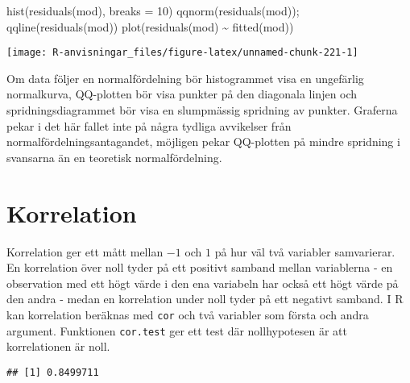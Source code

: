 \documentclass[
]{book}
\newenvironment{Shaded}{\begin{snugshade}}{\end{snugshade}}
\newcommand{\AttributeTok}[1]{\textcolor[rgb]{0.77,0.63,0.00}{#1}}
\newcommand{\DecValTok}[1]{\textcolor[rgb]{0.00,0.00,0.81}{#1}}
\newcommand{\FunctionTok}[1]{\textcolor[rgb]{0.00,0.00,0.00}{#1}}
\newcommand{\NormalTok}[1]{#1}
\newcommand{\SpecialCharTok}[1]{\textcolor[rgb]{0.00,0.00,0.00}{#1}}
\theoremstyle{definition}
\theoremstyle{definition}
\theoremstyle{definition}
\theoremstyle{definition}
\theoremstyle{remark}
\begin{document}
\begin{Shaded}
\begin{Highlighting}[]
\FunctionTok{hist}\NormalTok{(}\FunctionTok{residuals}\NormalTok{(mod), }\AttributeTok{breaks =} \DecValTok{10}\NormalTok{)}
\FunctionTok{qqnorm}\NormalTok{(}\FunctionTok{residuals}\NormalTok{(mod)); }\FunctionTok{qqline}\NormalTok{(}\FunctionTok{residuals}\NormalTok{(mod))}
\FunctionTok{plot}\NormalTok{(}\FunctionTok{residuals}\NormalTok{(mod) }\SpecialCharTok{\textasciitilde{}} \FunctionTok{fitted}\NormalTok{(mod))}
\end{Highlighting}
\end{Shaded}

\begin{center}\texttt{[image: R-anvisningar\_files/figure-latex/unnamed-chunk-221-1]} \end{center}

Om data följer en normalfördelning bör histogrammet visa en ungefärlig normalkurva, QQ-plotten bör visa punkter på den diagonala linjen och spridningsdiagrammet bör visa en slumpmässig spridning av punkter. Graferna pekar i det här fallet inte på några tydliga avvikelser från normalfördelningsantagandet, möjligen pekar QQ-plotten på mindre spridning i svansarna än en teoretisk normalfördelning.

\hypertarget{korrelation}{%
\section{Korrelation}\label{korrelation}}

Korrelation ger ett mått mellan \(-1\) och \(1\) på hur väl två variabler samvarierar. En korrelation över noll tyder på ett positivt samband mellan variablerna - en observation med ett högt värde i den ena variabeln har också ett högt värde på den andra - medan en korrelation under noll tyder på ett negativt samband. I R kan korrelation beräknas med \texttt{cor} och två variabler som första och andra argument. Funktionen \texttt{cor.test} ger ett test där nollhypotesen är att korrelationen är noll.

\begin{Shaded}
\end{Shaded}

\begin{verbatim}
## [1] 0.8499711
\end{verbatim}
\end{document}
